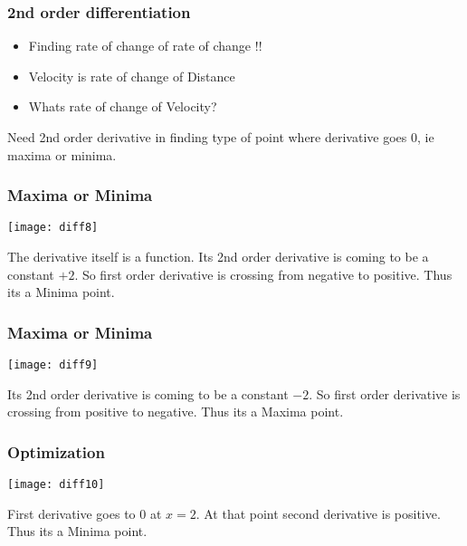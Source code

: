  \begin{frame}[fragile] \frametitle{2nd order differentiation}

\begin{itemize}
	\item Finding rate of change of rate of change !!
	\item Velocity is rate of change of Distance
	\item Whats rate of change of Velocity?
	
\end{itemize}
Need 2nd order derivative in finding type of point where derivative goes 0, ie maxima or minima.

\end{frame}

 \begin{frame}[fragile] \frametitle{Maxima or Minima}

\begin{center}
\texttt{[image: diff8]}
\end{center}

The derivative itself is a function. Its 2nd order derivative is coming to be a constant $+2$. 
So first order derivative is crossing from negative to positive. Thus its a Minima point.
\end{frame}

 \begin{frame}[fragile] \frametitle{Maxima or Minima}

\begin{center}
\texttt{[image: diff9]}
\end{center}

Its 2nd order derivative is coming to be a constant $-2$. 
So first order derivative is crossing from positive to negative. Thus its a Maxima point.
\end{frame}


 \begin{frame}[fragile] \frametitle{Optimization}

\begin{center}
\texttt{[image: diff10]}
\end{center}
First derivative goes to 0 at $x=2$. At that point second derivative is positive. Thus its a Minima point.

\end{frame}









